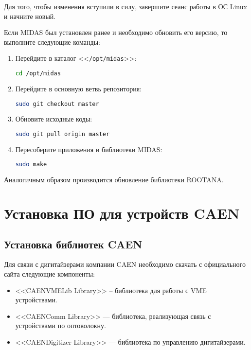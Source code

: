 \documentclass[12pt, a4paper, oneside, onecolumn]{book}
\newcommand{\MIDAS}{\mbox{MIDAS}}
\newcommand{\ROOTANA}{\mbox{ROOTANA}}
\newcommand{\DIRECTORY}[1]{<<{\tt #1}>>}
\begin{document}
Для того, чтобы изменения вступили в силу, завершите сеанс работы в ОС Linux и начните новый.

Если \MIDAS{} был установлен ранее и необходимо обновить его версию, то выполните следующие команды:

\begin{enumerate}
\item Перейдите в каталог \DIRECTORY{/opt/midas}:

\begin{lstlisting}[language=bash]
cd /opt/midas
\end{lstlisting}

\item Перейдите в основную ветвь репозитория:

\begin{lstlisting}[language=bash]
sudo git checkout master
\end{lstlisting}

\item Обновите исходные коды:

\begin{lstlisting}[language=bash]
sudo git pull origin master
\end{lstlisting}

\item Пересоберите приложения и библиотеки \MIDAS{}:

\begin{lstlisting}[language=bash]
sudo make
\end{lstlisting}

\end{enumerate}

Аналогичным образом производится обновление библиотеки \ROOTANA{}.

\section{Установка ПО для устройств CAEN}

\subsection{Установка библиотек CAEN}

Для связи с дигитайзерами компании CAEN необходимо скачать с официального сайта \cite{CaenHome} следующие компоненты:

\begin{itemize}

\item <<CAENVMELib Library>> -- библиотека для работы с VME устройствами.

\item <<CAENComm Library>> --- библиотека, реализующая связь с устройствами по оптоволокну.

\item <<CAENDigitizer Library>> --- библиотека по управлению дигитайзерами.

\end{itemize}
\end{document}
